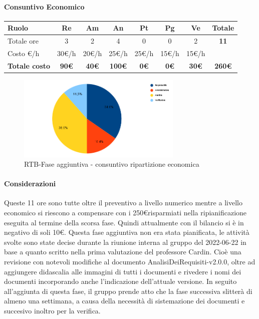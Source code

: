 \paragraph{Consuntivo Economico}
\begin{center}
	\renewcommand{\arraystretch}{1.8}
	\begin{tabular}{ |m{6em}|c|c|c|c|c|c|c| }
	\hline
	\textbf{Ruolo} & \textbf{Re} & \textbf{Am} &  \textbf{An} &  \textbf{Pt} &  \textbf{Pg} &  \textbf{Ve} &  \textbf{Totale}\\
    \hline
    Totale ore & 3 & 2 & 4 & 0 & 0 & 2 & \textbf{11}\\
    \hline
    Costo \euro/h & 30\euro/h & 20\euro/h & 25\euro/h & 25\euro/h & 15\euro/h & 15\euro/h & \\
    \hline
    \textbf{Totale costo} & \textbf{90\euro} & \textbf{40\euro} &  \textbf{100\euro} &  \textbf{0\euro} &  \textbf{0\euro} &  \textbf{30\euro} &  \textbf{260\euro}\\
    \hline
	\end{tabular}
    \begin{figure}[H]
        \centering\includegraphics[width=0.7\textwidth, height=0.7\textheight, keepaspectratio]{images/consuntivo/RTB-fase-aggiuntiva-costo.png}
        \caption{RTB-Fase aggiuntiva - consuntivo ripartizione economica}
    \end{figure}
\end{center}

\paragraph{Considerazioni} \hfill \break
Queste 11 ore sono tutte oltre il preventivo a livello numerico mentre a livello economico si riescono a compensare con i 250\euro risparmiati nella ripianificazione eseguita al termine della scorsa fase.
Quindi attualmente con il bilancio si è in negativo di soli 10\euro. \newline
Questa fase aggiuntiva non era stata pianificata, le attività svolte sono state decise durante la riunione interna al gruppo del 2022-06-22 in base a quanto scritto nella prima valutazione del professore Cardin.
Cioè una revisione con notevoli modifiche al documento AnalisiDeiRequisiti-v2.0.0, oltre ad aggiungere didascalia alle immagini di tutti i documenti e rivedere i nomi dei documenti incorporando anche l'indicazione dell'attuale versione.\newline 
In seguito all'aggiunta di questa fase, il gruppo prende atto che la fase successiva slitterà di almeno una settimana, a causa della necessità di sistemazione dei documenti e succesivo inoltro per la verifica. 